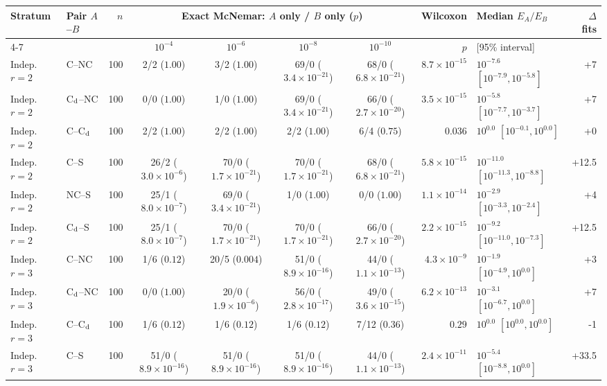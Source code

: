 \begin{tabular}{@{}llr cccc r l r@{}}
\toprule
Stratum & Pair $A$--$B$ & $n$ & \multicolumn{4}{c}{Exact McNemar: $A$ only / $B$ only ($p$)} & Wilcoxon & Median $E_A/E_B$ & $\Delta$ fits\\
\cmidrule(lr){4-7}
 & & & $10^{-4}$ & $10^{-6}$ & $10^{-8}$ & $10^{-10}$ & $p$ & [95\% interval] & \\
\midrule
Indep. $r=2$ & C--NC & 100 & 2/2 ($1.00$) & 3/2 ($1.00$) & 69/0 ($3.4\times10^{-21}$) & 68/0 ($6.8\times10^{-21}$) & $8.7\times10^{-15}$ & $10^{-7.6}$ $[10^{-7.9},10^{-5.8}]$ & +7\\
Indep. $r=2$ & C$_{\rm d}$--NC & 100 & 0/0 ($1.00$) & 1/0 ($1.00$) & 69/0 ($3.4\times10^{-21}$) & 66/0 ($2.7\times10^{-20}$) & $3.5\times10^{-15}$ & $10^{-5.8}$ $[10^{-7.7},10^{-3.7}]$ & +7\\
Indep. $r=2$ & C--C$_{\rm d}$ & 100 & 2/2 ($1.00$) & 2/2 ($1.00$) & 2/2 ($1.00$) & 6/4 ($0.75$) & $0.036$ & $10^{0.0}$ $[10^{-0.1},10^{0.0}]$ & +0\\
Indep. $r=2$ & C--S & 100 & 26/2 ($3.0\times10^{-6}$) & 70/0 ($1.7\times10^{-21}$) & 70/0 ($1.7\times10^{-21}$) & 68/0 ($6.8\times10^{-21}$) & $5.8\times10^{-15}$ & $10^{-11.0}$ $[10^{-11.3},10^{-8.8}]$ & +12.5\\
Indep. $r=2$ & NC--S & 100 & 25/1 ($8.0\times10^{-7}$) & 69/0 ($3.4\times10^{-21}$) & 1/0 ($1.00$) & 0/0 ($1.00$) & $1.1\times10^{-14}$ & $10^{-2.9}$ $[10^{-3.3},10^{-2.4}]$ & +4\\
Indep. $r=2$ & C$_{\rm d}$--S & 100 & 25/1 ($8.0\times10^{-7}$) & 70/0 ($1.7\times10^{-21}$) & 70/0 ($1.7\times10^{-21}$) & 66/0 ($2.7\times10^{-20}$) & $2.2\times10^{-15}$ & $10^{-9.2}$ $[10^{-11.0},10^{-7.3}]$ & +12.5\\
Indep. $r=3$ & C--NC & 100 & 1/6 ($0.12$) & 20/5 ($0.004$) & 51/0 ($8.9\times10^{-16}$) & 44/0 ($1.1\times10^{-13}$) & $4.3\times10^{-9}$ & $10^{-1.9}$ $[10^{-4.9},10^{0.0}]$ & +3\\
Indep. $r=3$ & C$_{\rm d}$--NC & 100 & 0/0 ($1.00$) & 20/0 ($1.9\times10^{-6}$) & 56/0 ($2.8\times10^{-17}$) & 49/0 ($3.6\times10^{-15}$) & $6.2\times10^{-13}$ & $10^{-3.1}$ $[10^{-6.7},10^{0.0}]$ & +7\\
Indep. $r=3$ & C--C$_{\rm d}$ & 100 & 1/6 ($0.12$) & 1/6 ($0.12$) & 1/6 ($0.12$) & 7/12 ($0.36$) & $0.29$ & $10^{0.0}$ $[10^{0.0},10^{0.0}]$ & -1\\
Indep. $r=3$ & C--S & 100 & 51/0 ($8.9\times10^{-16}$) & 51/0 ($8.9\times10^{-16}$) & 51/0 ($8.9\times10^{-16}$) & 44/0 ($1.1\times10^{-13}$) & $2.4\times10^{-11}$ & $10^{-5.4}$ $[10^{-8.8},10^{0.0}]$ & +33.5\\

\end{tabular}
